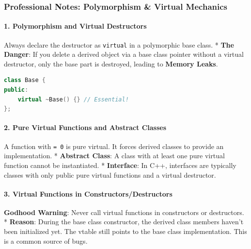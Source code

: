 \hypertarget{professional-notes-polymorphism-virtual-mechanics}{%
\subsubsection{Professional Notes: Polymorphism \& Virtual
Mechanics}\label{professional-notes-polymorphism-virtual-mechanics}}

\hypertarget{polymorphism-and-virtual-destructors}{%
\paragraph{1. Polymorphism and Virtual
Destructors}\label{polymorphism-and-virtual-destructors}}

Always declare the destructor as \passthrough{\lstinline!virtual!} in a
polymorphic base class. * \textbf{The Danger}: If you delete a derived
object via a base class pointer without a virtual destructor, only the
base part is destroyed, leading to \textbf{Memory Leaks}.

\begin{lstlisting}[language={C++}]
class Base {
public:
    virtual ~Base() {} // Essential!
};
\end{lstlisting}

\hypertarget{pure-virtual-functions-and-abstract-classes}{%
\paragraph{2. Pure Virtual Functions and Abstract
Classes}\label{pure-virtual-functions-and-abstract-classes}}

A function with \passthrough{\lstinline!= 0!} is pure virtual. It forces
derived classes to provide an implementation. * \textbf{Abstract Class}:
A class with at least one pure virtual function cannot be instantiated.
* \textbf{Interface}: In C++, interfaces are typically classes with only
public pure virtual functions and a virtual destructor.

\hypertarget{virtual-functions-in-constructorsdestructors}{%
\paragraph{3. Virtual Functions in
Constructors/Destructors}\label{virtual-functions-in-constructorsdestructors}}

\textbf{Godhood Warning}: Never call virtual functions in constructors
or destructors. * \textbf{Reason}: During the base class constructor,
the derived class members haven't been initialized yet. The vtable still
points to the base class implementation. This is a common source of
bugs.

